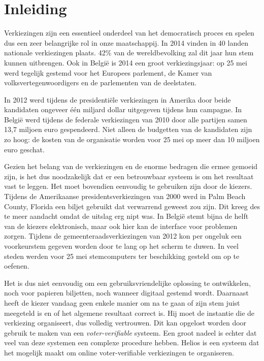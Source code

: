 % 
%

\chapter{Inleiding}
\label{chap:inleiding}

Verkiezingen zijn een essentieel onderdeel van het democratisch proces en spelen dus een zeer belangrijke rol in onze maatschappij. In 2014 vinden in 40 landen nationale verkiezingen plaats. 42\% van de wereldbevolking zal dit jaar hun stem kunnen uitbrengen.\cite{news:economist_2014_ballot_boxes} Ook in Belgi\"e is 2014 een groot verkiezingsjaar: op 25 mei werd tegelijk gestemd voor het Europees parlement, de Kamer van volksvertegenwoordigers en de parlementen van de deelstaten.

\npar In 2012 werd tijdens de presidenti\"ele verkiezingen in Amerika door beide kandidaten ongeveer \'e\'en miljard dollar uitgegeven tijdens hun campagne.\cite{news:nytimes_2012_money_race} In Belgi\"e werd tijdens de federale verkiezingen van 2010 door alle partijen samen 13,7 miljoen euro gespendeerd. Niet alleen de budgetten van de kandidaten zijn zo hoog: de kosten van de organisatie worden voor 25 mei op meer dan 10 miljoen euro geschat.\cite{news:tijd_moeder_aller_verkiezingen_kostprijs}

\npar Gezien het belang van de verkiezingen en de enorme bedragen die ermee gemoeid zijn, is het dus noodzakelijk dat er een betrouwbaar systeem is om het resultaat vast te leggen. Het moet bovendien eenvoudig te gebruiken zijn door de kiezers. Tijdens de Amerikaanse presidentsverkiezingen van 2000 werd in Palm Beach County, Florida een biljet gebruikt dat verwarrend geweest zou zijn. Dit kreeg des te meer aandacht omdat de uitslag erg nipt was.\cite{wiki:united_states_presidential_election_in_florida_2000} In Belgi\"e stemt bijna de helft van de kiezers elektronisch, maar ook hier kan de interface voor problemen zorgen. Tijdens de gemeenteraadsverkiezingen van 2012 kon per ongeluk een voorkeurstem gegeven worden door te lang op het scherm te duwen.\cite{news:maddens_zijn_de_stemcomputers_wel_te_vertrouwen} In veel steden werden voor 25 mei stemcomputers ter beschikking gesteld om op te oefenen.\cite{news:de_redactie_ga_eens_oefenen_op_een_stemcomputer}

\npar Het is dus niet eenvoudig om een gebruiksvriendelijke oplossing te ontwikkelen, noch voor papieren biljetten, noch wanneer digitaal gestemd wordt. Daarnaast heeft de kiezer vandaag geen enkele manier om na te gaan of zijn stem juist meegeteld is en of het algemene resultaat correct is. Hij moet de instantie die de verkiezing organiseert, dus volledig vertrouwen. Dit kan opgelost worden door gebruik te maken van een \textit{voter-verifiable} systeem. Een groot nadeel is echter dat veel van deze systemen een complexe procedure hebben. Helios is een systeem dat het mogelijk maakt om online voter-verifiable verkiezingen te organiseren.

